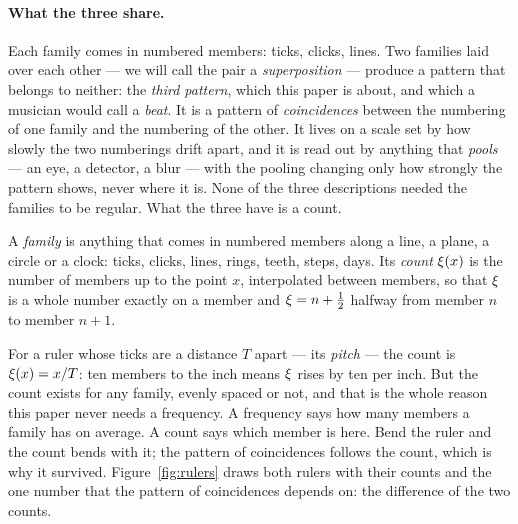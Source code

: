\paragraph{What the three share.}
Each family comes in numbered members: ticks, clicks, lines. Two families
laid over each other --- we will call the pair a \emph{superposition} ---
produce a pattern that belongs to neither: the \emph{third pattern}, which
this paper is about, and which a musician would call a \emph{beat}. It is a
pattern of \emph{coincidences} between the numbering of one family and the
numbering of the other. It lives on a scale set by how slowly the two
numberings drift apart, and it is read out by anything that \emph{pools}
--- an eye, a detector, a blur --- with the pooling changing only how
strongly the pattern shows, never where it is. None of the three
descriptions needed the families to be regular. What the three have is a
count.

\begin{definition}
\label{def:count}
A \emph{family} is anything that comes in numbered members along a line, a
plane, a circle or a clock: ticks, clicks, lines, rings, teeth, steps, days.
Its \emph{count} $\xi(x)$ is the number of members up to the point $x$,
interpolated between members, so that $\xi$ is a whole number exactly on a
member and $\xi=n+\tfrac12$ halfway from member $n$ to member $n+1$.
\end{definition}

For a ruler whose ticks are a distance $T$ apart --- its \emph{pitch} ---
the count is $\xi(x)=x/T$: ten members to the inch means $\xi$ rises by ten
per inch. But the count exists for any family, evenly spaced or not, and
that is the whole reason this paper never needs a frequency. A frequency
says how many members a family has on average. A count says which member
is here. Bend the ruler and the count bends with it; the pattern of
coincidences follows the count, which is why it survived. Figure~\ref{fig:rulers}
draws both rulers with their counts and the one number that the pattern of
coincidences depends on: the difference of the two counts.

